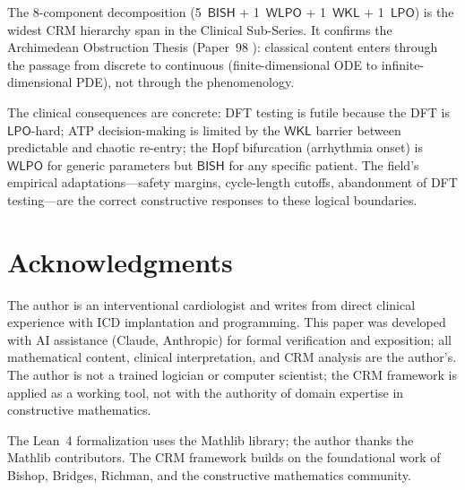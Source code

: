 \documentclass[11pt,a4paper]{article}
\theoremstyle{plain}
\theoremstyle{definition}
\newcommand{\BISH}{\textsf{BISH}}
\newcommand{\WKL}{\textsf{WKL}}
\newcommand{\WLPO}{\textsf{WLPO}}
\newcommand{\LPO}{\textsf{LPO}}
\begin{document}
The 8-component decomposition (5~$\BISH$ + 1~$\WLPO$ + 1~$\WKL$ + 1~$\LPO$) is the widest CRM hierarchy span in the Clinical Sub-Series.  It confirms the Archimedean Obstruction Thesis (Paper~98 \cite{p98}): classical content enters through the passage from discrete to continuous (finite-dimensional ODE to infinite-dimensional PDE), not through the phenomenology.

The clinical consequences are concrete: DFT testing is futile because the DFT is $\LPO$-hard; ATP decision-making is limited by the $\WKL$ barrier between predictable and chaotic re-entry; the Hopf bifurcation (arrhythmia onset) is $\WLPO$ for generic parameters but $\BISH$ for any specific patient.  The field's empirical adaptations---safety margins, cycle-length cutoffs, abandonment of DFT testing---are the correct constructive responses to these logical boundaries.

\section{Acknowledgments}

The author is an interventional cardiologist and writes from direct clinical experience with ICD implantation and programming.  This paper was developed with AI assistance (Claude, Anthropic) for formal verification and exposition; all mathematical content, clinical interpretation, and CRM analysis are the author's.  The author is not a trained logician or computer scientist; the CRM framework is applied as a working tool, not with the authority of domain expertise in constructive mathematics.

The Lean~4 formalization uses the Mathlib library; the author thanks the Mathlib contributors.  The CRM framework builds on the foundational work of Bishop, Bridges, Richman, and the constructive mathematics community.
\end{document}
